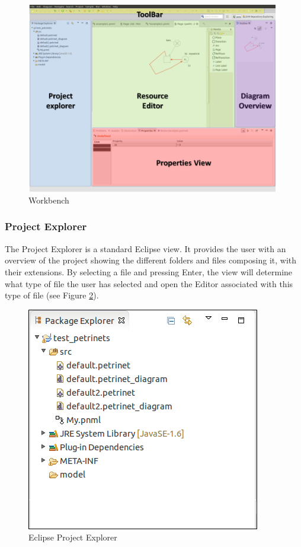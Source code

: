 \begin{figure}[htp]
\begin{center}
  \includegraphics[scale=0.45]{image/gui_editors.png}
  \caption{Workbench}
  \label{fig:gui_editors}
\end{center}
\end{figure}

\subsubsection{Project Explorer}
The Project Explorer is a standard Eclipse view. It provides the user with an overview of the project showing the different folders and files composing it, with their extensions. By selecting a file and pressing Enter, the view will determine what type of file the user has selected and open the Editor associated with this type of file (see Figure \ref{fig:gui_file_editor}).

\begin{figure}[htp]
\begin{center}
  \includegraphics[scale=0.45]{image/gui_file_editor.png}
  \caption{Eclipse Project Explorer}
  \label{fig:gui_file_editor}
\end{center}
\end{figure}

